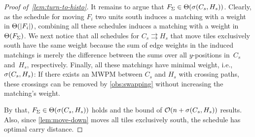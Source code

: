 \begin{proof}[Proof of~\cref{lem:turn-to-histo}]
	It remains to argue that $F_\Sigma \in \Theta(\sigma(C_s, H_s))$.
	Clearly, as the schedule for moving $F_i$ two units south induces a matching with a weight in $\Theta(|F_i|)$, combining all these schedules induces a matching with a weight in $\Theta(F_\Sigma)$.
	We next notice that all schedules for $C_s\rightrightarrows H_s$ that move tiles exclusively south have the same weight because the sum of edge weights in the induced matchings is merely the difference between the sums over all $y$\nobreakdash-positions in~$C_s$ and~$H_s$, respectively.
	Finally, all these matchings have minimal weight, i.e., $\sigma(C_s, H_s)$:
	If there exists an MWPM between $C_s$ and $H_s$ with crossing paths, these crossings can be removed by \cref{obs:swapping} without increasing the matching's weight.

	By that, $F_\Sigma \in \Theta(\sigma(C_s, H_s))$ holds and the bound of $\mathcal{O}(n + \sigma(C_s,H_s))$ results.
	Also, since \cref{lem:move-down} moves all tiles exclusively south, the schedule has optimal carry distance.
\end{proof}

